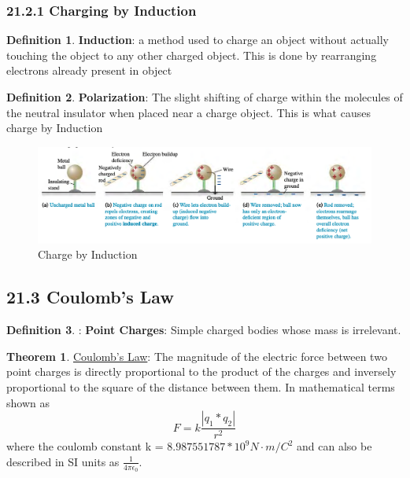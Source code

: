 \documentclass[12pt]{amsart}
\theoremstyle{definition}
\newtheorem{theorem}{Theorem}  %
\newtheorem{definition}{Definition} %
\numberwithin{equation}{theorem}    %
\begin{document}
\subsubsection*{21.2.1 Charging by Induction}

\begin{definition}
    \textbf{Induction}: 
    a method used to charge an object without actually touching the object to 
    any other charged object. This is done by rearranging electrons already 
    present in object
\end{definition}

\begin{definition}
    \textbf{Polarization}: 
    The slight shifting of charge within the molecules of the neutral insulator
    when placed near a charge object. This is what causes charge by Induction
\end{definition}

\begin{figure}[H]
    \centering
    \includegraphics[width=5in]{Media/Induction.png}
    \caption{Charge by Induction}
    \label{Charge by Induction}
\end{figure}

\subsection*{21.3 Coulomb's Law}
\begin{definition}:
    \textbf{Point Charges}:
    Simple charged bodies whose mass is irrelevant.
\end{definition}

\begin{theorem}
    \underline{Coulomb's Law}: The magnitude of the electric force between two 
    point charges is directly proportional to the product of the charges and
    inversely proportional to the square of the distance between them.
    In mathematical terms shown as $$F=k\frac{|q_1*q_2|}{r^2}$$ 
    where the coulomb constant k = $8.987551787*10^9 N \cdot m/C^2$ and can 
    also be described in SI units as $\frac{1}{4\pi\epsilon_0}$.
\end{theorem}
\end{document}
